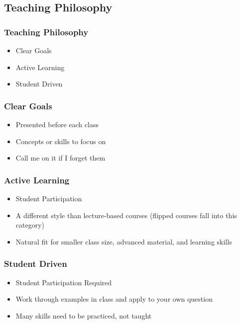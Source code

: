 \documentclass{beamer}
\begin{document}
\subsection{Teaching Philosophy}
\begin{frame}
\frametitle{Teaching Philosophy}
\begin{itemize}
	\item Clear Goals
	\item Active Learning
	\item Student Driven
\end{itemize}

\end{frame}
\begin{frame}
\frametitle{Clear Goals}
\begin{itemize}
	\item Presented before each class
	\item Concepts or skills to focus on
	\item Call me on it if I forget them
\end{itemize}
%
\end{frame}
\begin{frame}
\frametitle{Active Learning}
\begin{itemize}
	\item Student Participation
	\item A different style than lecture-based courses (flipped courses fall into this category)
	\item Natural fit for smaller class size, advanced material, and learning skills
\end{itemize}

%
\end{frame}
\begin{frame}
\frametitle{Student Driven}
\begin{itemize}
	\item Student Participation Required
	\item Work through examples in class and apply to your own question
	\item Many skills need to be practiced, not taught
\end{itemize}

%
\end{frame}
\end{document}
